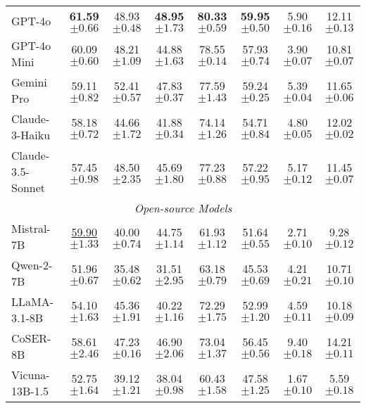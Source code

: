 \begin{table*}[t]
{\begin{tabularx}{\textwidth}{@{}l*{4}{c}ccc@{}}
GPT-4o & \textbf{61.59\scriptsize{$\pm0.66$}} & 48.93\scriptsize{$\pm0.48$} & \textbf{48.95\scriptsize{$\pm1.73$}} & \textbf{80.33\scriptsize{$\pm0.59$}} & \textbf{59.95\scriptsize{$\pm0.50$}} & 5.90\scriptsize{$\pm0.16$} & 12.11\scriptsize{$\pm0.13$} \\
GPT-4o Mini & 60.09\scriptsize{$\pm0.60$} & 48.21\scriptsize{$\pm1.09$} & 44.88\scriptsize{$\pm1.63$} & 78.55\scriptsize{$\pm0.14$} & 57.93\scriptsize{$\pm0.74$} & 3.90\scriptsize{$\pm0.07$} & 10.81\scriptsize{$\pm0.07$} \\
Gemini Pro & 59.11\scriptsize{$\pm0.82$} & 52.41\scriptsize{$\pm0.57$} & 47.83\scriptsize{$\pm0.37$} & 77.59\scriptsize{$\pm1.43$} & 59.24\scriptsize{$\pm0.25$} & 5.39\scriptsize{$\pm0.04$} & 11.65\scriptsize{$\pm0.06$} \\
Claude-3-Haiku & 58.18\scriptsize{$\pm0.72$} & 44.66\scriptsize{$\pm1.72$} & 41.88\scriptsize{$\pm0.34$} & 74.14\scriptsize{$\pm1.26$} & 54.71\scriptsize{$\pm0.84$} & 4.80\scriptsize{$\pm0.05$} & 12.02\scriptsize{$\pm0.02$} \\
Claude-3.5-Sonnet & 57.45\scriptsize{$\pm0.98$} & 48.50\scriptsize{$\pm2.35$} & 45.69\scriptsize{$\pm1.80$} & 77.23\scriptsize{$\pm0.88$} & 57.22\scriptsize{$\pm0.95$} & 5.17\scriptsize{$\pm0.12$} & 11.45\scriptsize{$\pm0.07$} \\
\midrule
\multicolumn{8}{c}{\textit{Open-source Models}} \\
\midrule
Mistral-7B & \underline{59.90\scriptsize{$\pm1.33$}} & 40.00\scriptsize{$\pm0.74$} & 44.75\scriptsize{$\pm1.14$} & 61.93\scriptsize{$\pm1.12$} & 51.64\scriptsize{$\pm0.55$} & 2.71\scriptsize{$\pm0.10$} & 9.28\scriptsize{$\pm0.12$} \\
Qwen-2-7B & 51.96\scriptsize{$\pm0.67$} & 35.48\scriptsize{$\pm0.62$} & 31.51\scriptsize{$\pm2.95$} & 63.18\scriptsize{$\pm0.79$} & 45.53\scriptsize{$\pm0.69$} & 4.21\scriptsize{$\pm0.21$} & 10.71\scriptsize{$\pm0.10$} \\
LLaMA-3.1-8B & 54.10\scriptsize{$\pm1.63$} & 45.36\scriptsize{$\pm1.91$} & 40.22\scriptsize{$\pm1.16$} & 72.29\scriptsize{$\pm1.75$} & 52.99\scriptsize{$\pm1.20$} & 4.59\scriptsize{$\pm0.11$} & 10.18\scriptsize{$\pm0.09$} \\
CoSER-8B & 58.61\scriptsize{$\pm2.46$} & 47.23\scriptsize{$\pm0.16$} & 46.90\scriptsize{$\pm2.06$} & 73.04\scriptsize{$\pm1.37$} & 56.45\scriptsize{$\pm0.56$} & 9.40\scriptsize{$\pm0.18$} & 14.21\scriptsize{$\pm0.11$} \\
Vicuna-13B-1.5 & 52.75\scriptsize{$\pm1.64$} & 39.12\scriptsize{$\pm1.21$} & 38.04\scriptsize{$\pm0.98$} & 60.43\scriptsize{$\pm1.58$} & 47.58\scriptsize{$\pm1.25$} & 1.67\scriptsize{$\pm0.10$} & 5.59\scriptsize{$\pm0.18$} \\

\end{tabularx}}
\end{table*}
